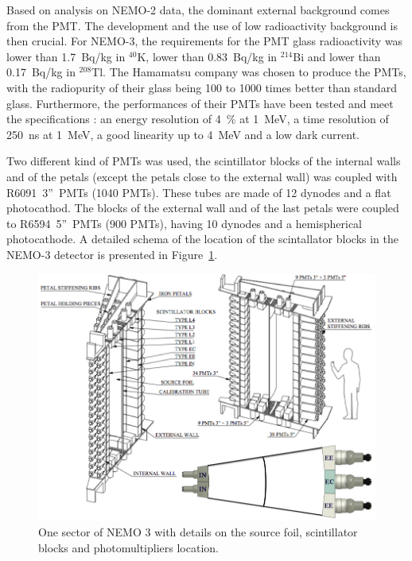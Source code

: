 \documentclass[main.tex]{subfiles}
\begin{document}
\bigskip


\NI Based on analysis on NEMO-2 data, the dominant external background comes from the PMT. The development and the use of low radioactivity background is then crucial. For NEMO-3, the requirements for the PMT glass radioactivity was lower than 1.7~Bq/kg in $^{\text{40}}$K, lower than 0.83~Bq/kg in $^{\text{214}}$Bi and lower than 0.17~Bq/kg in $^{\text{208}}$Tl. The Hamamatsu company was chosen to produce the PMTs, with the radiopurity of their glass being 100 to 1000 times better than standard glass. Furthermore, the performances of their PMTs have been tested and meet the specifications : an energy resolution of 4~\% at 1~MeV, a time resolution of 250~ns at 1~MeV, a good linearity up to 4~MeV and a low dark current.  


\bigskip


\NI Two different kind of PMTs was used, the scintillator blocks of the internal walls and of the petals (except the petals close to the external wall) was coupled with R6091~3''~PMTs (1040 PMTs). These tubes are made of 12 dynodes and a flat photocathod. The blocks of the external wall and of the last petals were coupled to R6594~5''~PMTs (900 PMTs), having 10 dynodes and a hemispherical photocathode. A detailed schema of the location of the scintallator blocks in the NEMO-3 detector is presented in Figure~\ref{SectorDetailedPMTconfig}.


\bigskip


\begin{figure}[h!]
\begin{center}
\includegraphics[scale=0.32]{pictures/Chap3/SectorDetailedPMTconfig.png}
\caption{One sector of NEMO 3 with details on the source foil, scintillator blocks and photomultipliers location.}
\label{SectorDetailedPMTconfig}
\end{center}
\end{figure}
\end{document}
